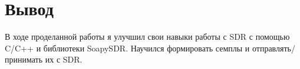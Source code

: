 \chapter{Вывод}
\label{ch:chap3}

В ходе проделанной работы я улучшил свои навыки работы с SDR с помощью C/C++ и библиотеки SoapySDR. Научился формировать 
семплы и отправлять/принимать их с SDR. 

\endinput
